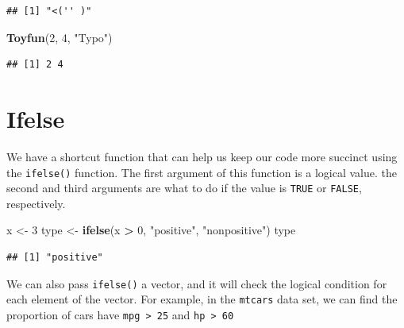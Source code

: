 \documentclass[
]{book}
\newenvironment{Shaded}{\begin{snugshade}}{\end{snugshade}}
\newcommand{\DecValTok}[1]{\textcolor[rgb]{0.00,0.00,0.81}{#1}}
\newcommand{\KeywordTok}[1]{\textcolor[rgb]{0.13,0.29,0.53}{\textbf{#1}}}
\newcommand{\NormalTok}[1]{#1}
\newcommand{\OperatorTok}[1]{\textcolor[rgb]{0.81,0.36,0.00}{\textbf{#1}}}
\newcommand{\OtherTok}[1]{\textcolor[rgb]{0.56,0.35,0.01}{#1}}
\newcommand{\StringTok}[1]{\textcolor[rgb]{0.31,0.60,0.02}{#1}}
\begin{document}
\begin{verbatim}
## [1] "<('' )"
\end{verbatim}

\begin{Shaded}
\begin{Highlighting}[]
\KeywordTok{Toyfun}\NormalTok{(}\DecValTok{2}\NormalTok{, }\DecValTok{4}\NormalTok{, }\StringTok{"Typo"}\NormalTok{)}
\end{Highlighting}
\end{Shaded}

\begin{verbatim}
## [1] 2 4
\end{verbatim}

\hypertarget{ifelse}{%
\section{Ifelse}\label{ifelse}}

We have a shortcut function that can help us keep our code more succinct using the \texttt{ifelse()} function. The first argument of this function is a logical value. the second and third arguments are what to do if the value is \texttt{TRUE} or \texttt{FALSE}, respectively.

\begin{Shaded}
\begin{Highlighting}[]
\NormalTok{x <-}\StringTok{ }\DecValTok{3}
\NormalTok{type <-}\StringTok{ }\KeywordTok{ifelse}\NormalTok{(x }\OperatorTok{>}\StringTok{ }\DecValTok{0}\NormalTok{,}
    \StringTok{"positive"}\NormalTok{, }\StringTok{"nonpositive"}\NormalTok{)}
\NormalTok{type}
\end{Highlighting}
\end{Shaded}

\begin{verbatim}
## [1] "positive"
\end{verbatim}

We can also pass \texttt{ifelse()} a vector, and it will check the logical condition for each element of the vector. For example, in the \texttt{mtcars} data set, we can find the proportion of cars have \texttt{mpg\ \textgreater{}\ 25} and \texttt{hp\ \textgreater{}\ 60}

\begin{Shaded}
\end{Shaded}
\end{document}
